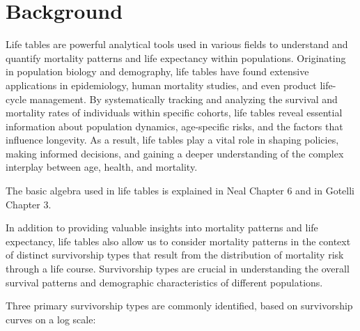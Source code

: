\documentclass[
  a4paper]{book}
\begin{document}
\hypertarget{background-5}{%
\section{Background}\label{background-5}}

Life tables are powerful analytical tools used in various fields to understand and quantify mortality patterns and life expectancy within populations. Originating in population biology and demography, life tables have found extensive applications in epidemiology, human mortality studies, and even product life-cycle management. By systematically tracking and analyzing the survival and mortality rates of individuals within specific cohorts, life tables reveal essential information about population dynamics, age-specific risks, and the factors that influence longevity. As a result, life tables play a vital role in shaping policies, making informed decisions, and gaining a deeper understanding of the complex interplay between age, health, and mortality.

The basic algebra used in life tables is explained in Neal Chapter 6 and in Gotelli Chapter 3.

In addition to providing valuable insights into mortality patterns and life expectancy, life tables also allow us to consider mortality patterns in the context of distinct survivorship types that result from the distribution of mortality risk through a life course. Survivorship types are crucial in understanding the overall survival patterns and demographic characteristics of different populations.

Three primary survivorship types are commonly identified, based on survivorship curves on a log scale:
\end{document}
